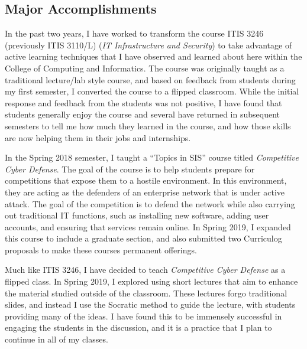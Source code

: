 \hypertarget{accomplishments}{%
\subsection{Major Accomplishments}\label{accomplishments}}

In the past two years, I have worked to transform the course ITIS 3246 (previously ITIS 3110/L) (\emph{IT Infrastructure and Security}) to take advantage of active learning techniques that I have observed and learned about here within the College of Computing and Informatics. The course was originally taught as a traditional lecture/lab style course, and based on feedback from students during my first semester, I converted the course to a flipped classroom. While the initial response and feedback from the students was not positive, I have found that students generally enjoy the course and several have returned in subsequent semesters to tell me how much they learned in the course, and how those skills are now helping them in their jobs and internships.

In the Spring 2018 semester, I taught a ``Topics in SIS'' course titled \emph{Competitive Cyber Defense}. The goal of the course is to help students prepare for competitions that expose them to a hostile environment. In this environment, they are acting as the defenders of an enterprise network that is under active attack. The goal of the competition is to defend the network while also carrying out traditional IT functions, such as installing new software, adding user accounts, and ensuring that services remain online. In Spring 2019, I expanded this course to include a graduate section, and also submitted two Curriculog proposals to make these courses permanent offerings.

Much like ITIS 3246, I have decided to teach \emph{Competitive Cyber Defense} as a flipped class. In Spring 2019, I explored using short lectures that aim to enhance the material studied outside of the classroom. These lectures forgo traditional slides, and instead I use the Socratic method to guide the lecture, with students providing many of the ideas. I have found this to be immensely successful in engaging the students in the discussion, and it is a practice that I plan to continue in all of my classes.